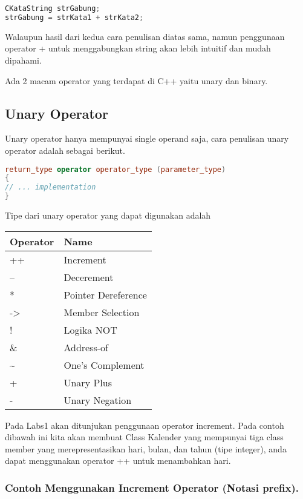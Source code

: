 \begin{lstlisting}[language=c++, numbers=none]
CKataString strGabung;
strGabung = strKata1 + strKata2;
\end{lstlisting}

Walaupun hasil dari kedua cara penulisan diatas sama, namun penggunaan
operator + untuk menggabungkan string akan lebih intuitif dan mudah
dipahami.

Ada 2 macam operator yang terdapat di C++ yaitu unary dan binary.

\subsection{Unary Operator}\label{unary-operator}

Unary operator hanya mempunyai single operand saja, cara penulisan unary
operator adalah sebagai berikut.

\begin{lstlisting}[language=c++, numbers=none]
return_type operator operator_type (parameter_type)
{
// ... implementation
}
\end{lstlisting}

Tipe dari unary operator yang dapat digunakan adalah

\begin{longtable}[]{@{}ll@{}}
\toprule
Operator & Name\tabularnewline
\midrule
\endhead
++ & Increment\tabularnewline
-- & Decerement\tabularnewline
* & Pointer Dereference\tabularnewline
-\textgreater{} & Member Selection\tabularnewline
! & Logika NOT\tabularnewline
\& & Address-of\tabularnewline
\textasciitilde{} & One's Complement\tabularnewline
+ & Unary Plus\tabularnewline
- & Unary Negation\tabularnewline
\bottomrule
\end{longtable}

Pada Labs1 akan ditunjukan penggunaan operator increment. Pada contoh
dibawah ini kita akan membuat Class Kalender yang mempunyai tiga class
member yang merepresentasikan hari, bulan, dan tahun (tipe integer),
anda dapat menggunakan operator ++ untuk menambahkan hari.

\subsubsection*{Contoh  Menggunakan Increment Operator (Notasi prefix).}

